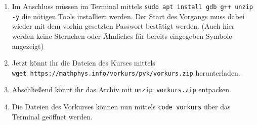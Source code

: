 \begin{enumerate}
	\item Im Anschluss müssen im Terminal mittels \texttt{sudo apt install gdb g++ unzip -y} die nötigen Tools installiert werden. 
		Der Start des Vorgangs muss dabei wieder mit dem vorhin gesetzten Passwort bestätigt werden. 
		(Auch hier werden keine Sternchen oder Ähnliches für bereits eingegeben Symbole angezeigt)
	\item Jetzt könnt ihr die Dateien des Kurses mittels \\
		\texttt{wget https://mathphys.info/vorkurs/pvk/vorkurs.zip} herunterladen.
	\item Abschließend könnt ihr das Archiv mit \texttt{unzip vorkurs.zip} entpacken.
	\item Die Dateien des Vorkurses können nun mittels \texttt{code vorkurs} über das Terminal geöffnet werden.
\end{enumerate}
